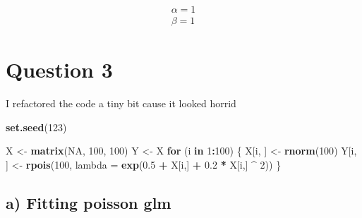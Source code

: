 \documentclass[]{article}
\newenvironment{Shaded}{\begin{snugshade}}{\end{snugshade}}
\newcommand{\ControlFlowTok}[1]{\textcolor[rgb]{0.13,0.29,0.53}{\textbf{#1}}}
\newcommand{\DataTypeTok}[1]{\textcolor[rgb]{0.13,0.29,0.53}{#1}}
\newcommand{\DecValTok}[1]{\textcolor[rgb]{0.00,0.00,0.81}{#1}}
\newcommand{\FloatTok}[1]{\textcolor[rgb]{0.00,0.00,0.81}{#1}}
\newcommand{\KeywordTok}[1]{\textcolor[rgb]{0.13,0.29,0.53}{\textbf{#1}}}
\newcommand{\NormalTok}[1]{#1}
\newcommand{\OperatorTok}[1]{\textcolor[rgb]{0.81,0.36,0.00}{\textbf{#1}}}
\newcommand{\OtherTok}[1]{\textcolor[rgb]{0.56,0.35,0.01}{#1}}
\newcommand{\StringTok}[1]{\textcolor[rgb]{0.31,0.60,0.02}{#1}}
\begin{document}
\[
\begin{aligned}
\alpha = 1
\\ \beta = 1
\end{aligned}
\]

\hypertarget{question-3}{%
\section{Question 3}\label{question-3}}

I refactored the code a tiny bit cause it looked horrid

\begin{Shaded}
\begin{Highlighting}[]
\KeywordTok{set.seed}\NormalTok{(}\DecValTok{123}\NormalTok{)}

\NormalTok{X <-}\StringTok{ }\KeywordTok{matrix}\NormalTok{(}\OtherTok{NA}\NormalTok{, }\DecValTok{100}\NormalTok{, }\DecValTok{100}\NormalTok{)}
\NormalTok{Y <-}\StringTok{ }\NormalTok{X}
\ControlFlowTok{for}\NormalTok{ (i }\ControlFlowTok{in} \DecValTok{1}\OperatorTok{:}\DecValTok{100}\NormalTok{) \{}
\NormalTok{    X[i, ] <-}\StringTok{ }\KeywordTok{rnorm}\NormalTok{(}\DecValTok{100}\NormalTok{)}
\NormalTok{    Y[i, ] <-}\StringTok{ }\KeywordTok{rpois}\NormalTok{(}\DecValTok{100}\NormalTok{, }\DataTypeTok{lambda =} \KeywordTok{exp}\NormalTok{(}\FloatTok{0.5} \OperatorTok{+}\StringTok{ }\NormalTok{X[i,] }\OperatorTok{+}\StringTok{ }\FloatTok{0.2} \OperatorTok{*}\StringTok{ }\NormalTok{X[i,] }\OperatorTok{^}\StringTok{ }\DecValTok{2}\NormalTok{))}
\NormalTok{\}}
\end{Highlighting}
\end{Shaded}

\hypertarget{a-fitting-poisson-glm}{%
\subsection{a) Fitting poisson glm}\label{a-fitting-poisson-glm}}
\end{document}
